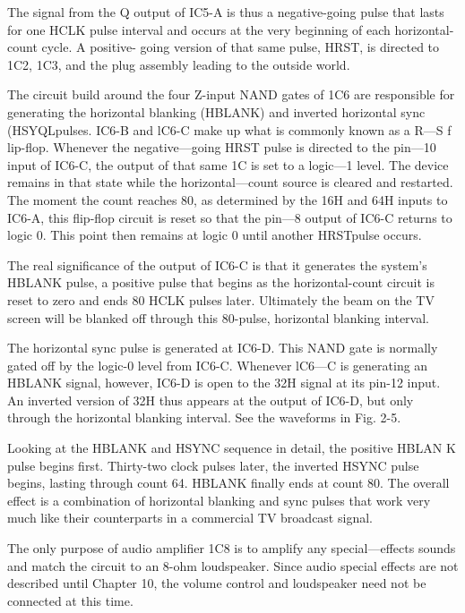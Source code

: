 \documentclass[11pt]{book}              %
\begin{document}
The signal from the Q output of IC5-A is thus a negative-going pulse that lasts for one HCLK pulse interval and occurs at the very beginning of each horizontal-count cycle. A positive- going version of that same pulse, HRST, is directed to 1C2, 1C3, and the plug assembly leading to the outside world.

The circuit build around the four Z-input NAND gates of 1C6 are responsible for generating the horizontal blanking (HBLANK) and inverted horizontal sync (HSYQLpulses. IC6-B and lC6-C make up what is commonly known as a R—S f lip-flop. Whenever the negative—going HRST pulse is directed to the pin—10 input of IC6-C, the output of that same 1C is set to a logic—1 level. The device remains in that state while the horizontal—count source is cleared and restarted. The moment the count reaches 80, as determined by the 16H and 64H inputs to IC6-A, this flip-flop circuit is reset so that the pin—8 output of IC6-C returns to logic 0. This point then remains at logic 0 until another HRSTpulse occurs.

The real significance of the output of IC6-C is that it generates the system’s HBLANK pulse, a positive pulse that begins as the horizontal-count circuit is reset to zero and ends 80 HCLK pulses later. Ultimately the beam on the TV screen will be blanked off through this 80-pulse, horizontal blanking interval.

The horizontal sync pulse is generated at IC6-D. This NAND gate is normally gated off by the logic-0 level from IC6-C. Whenever lC6—C is generating an HBLANK signal, however, IC6-D is open to the 32H signal at its pin-12 input. An inverted version of 32H thus appears at the output of IC6-D, but only through the horizontal blanking interval. See the waveforms in Fig. 2-5.

Looking at the HBLANK and HSYNC sequence in detail, the positive HBLAN K pulse begins first. Thirty-two clock pulses later, the inverted HSYNC pulse begins, lasting through count 64. HBLANK finally ends at count 80. The overall effect is a combination of horizontal blanking and sync pulses that work very much like their counterparts in a commercial TV broadcast signal.

The only purpose of audio amplifier 1C8 is to amplify any special—effects sounds and match the circuit to an 8-ohm loudspeaker. Since audio special effects are not described until Chapter 10, the volume control and loudspeaker need not be connected at this time.

\end{document}
